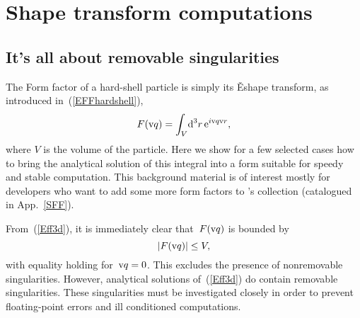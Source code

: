 
\chapter{Shape transform computations}  \label{SFFcomp}


\def\FFP{F_\parallel}
\def\FFPm{\Delta_\parallel}
\def\expm{\text{exp}_{-1}}
\def\R{\v{R}}
\let\textE=\E
\def\E{\v{E}}
\def\Gp{\Gamma_\parallel}
\def\x{\v{x}}
\def\V{\v{V}}
\def\qp{\v{p}}
\def\n{\v{\hat n}}
\def\uq{\v{\hat q}}
\def\uqp{\v{\hat p}}

\section{It's all about removable singularities}\label{SShapeTrafIntro}

The Form factor of a hard-shell particle is simply its \E{shape transform},
as introduced in~(\ref{EFFhardshell}),
\begin{equation}\label{Eff3d}
  F(\text{v}{q})=\int_V\!\text{d}^3r\, \text{e}^{i\text{v}{q}\text{v}{r}},
\end{equation}
where $V$ is the volume of the particle.
Here we show for a few selected cases
how to bring the analytical solution of this integral into a form
 suitable for speedy and stable computation.
This background material is of interest mostly for
developers who want to add some more form factors to \BornAgain's collection
(catalogued in App.~\ref{SFF}).

%
From~(\ref{Eff3d}), it is immediately clear that~$F(\text{v}{q})$ is bounded by
\begin{equation}
  |F(\text{v}{q})|\le V,
\end{equation}
with equality holding for~$\text{v}{q}=0$.
This excludes the presence of nonremovable singularities.
However, analytical solutions of~(\ref{Eff3d}) do contain
removable singularities.
These singularities must be investigated closely
in order to prevent floating-point errors and ill conditioned computations.

